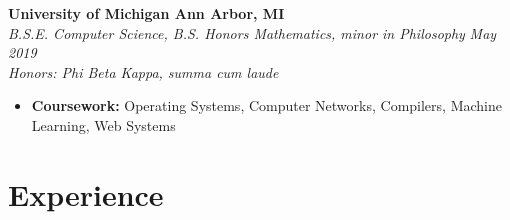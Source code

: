 \documentclass[margin,line]{resume}
\begin{document}
\begin{resume}
	\textbf{University of Michigan \hfill Ann Arbor, MI} \vspace{1mm}\\\vspace{1mm}%
	\textsl{B.S.E. Computer Science, B.S. Honors Mathematics, minor in Philosophy} \hfill \textsl{May 2019}\\
	\textsl{Honors: Phi Beta Kappa, summa cum laude} \\\vspace{-2.5mm}%
	\begin{itemize}[leftmargin=4mm]
		\item \textbf{Coursework:} Operating Systems, Computer Networks, Compilers, Machine Learning, Web Systems
	\end{itemize}
	\vspace{2.5mm}

	\sectionbreak
	\section{\mysidestyle Experience}
	
	

\end{resume}
\end{document}

